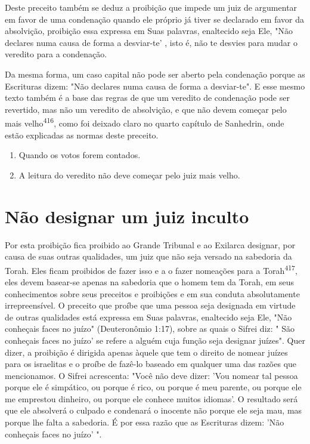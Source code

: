 \begin{itemize}
\begin{enumrate}
\begin{itemize}
\begin{itemize}
\begin{itemize}
Deste preceito também se deduz a proibição que impede um juiz de
argumentar em favor de uma condenação quando ele próprio já tiver se
decla­rado em favor da absolvição, proibição essa expressa em Suas
palavras, enalte­cido seja Ele, "Não declares numa causa de forma a
desviar-te' , isto é, não te desvies para mudar o veredito para a
condenação.

Da mesma forma, um caso capital não pode ser aberto pela conde­nação
porque as Escrituras dizem: "Não declares numa causa de forma a
desviar-te". E esse mesmo texto também é a base das regras de que um
veredito de condenação pode ser revertido, mas não um veredito de
absolvição, e que não devem começar pelo mais
velho\textsuperscript{416}, como foi deixado claro no quarto capítu­lo
de Sanhedrin, onde estão explicadas as normas deste preceito.


\begin{enumerate}
\def\labelenumi{\arabic{enumi}.}
\setcounter{enumi}{414}
\item
 
 Quando os votos forem contados.
 
\item
 
 A leitura do veredito não deve começar pelo juiz mais velho.
 
\end{enumerate}


\section{Não designar um juiz inculto}

Por esta proibição fica proibido ao Grande Tribunal e ao Exilarca
designar, por causa de suas outras qualidades, um juiz que não seja
versado na sabedoria da Torah. Eles ficam proibidos de fazer isso e a o
fazer nomeações para a Torah\textsuperscript{417}, eles devem basear-se
apenas na sabedoria que o homem tem da Torah, em seus conhecimentos
sobre seus preceitos e proibições e em sua conduta absolutamente
irrepreensível. O preceito que proíbe que uma pessoa seja designada em
virtude de outras qualidades está expressa em Suas palavras, enaltecido
seja Ele, "Não conheçais faces no juízo" (Deuteronômio 1:17), so­bre as
quais o Sifrei diz: " São conheçais faces no juízo' se refere a alguém
cuja função seja designar juízes". Quer dizer, a proibição é dirigida
apenas àquele que tem o direito de nomear juízes para os israelitas e o
proíbe de fazê-lo basea­do em qualquer uma das razões que mencionamos. O
Sifrei acrescenta: "Você não deve dizer: 'Vou nomear tal pessoa porque
ele é simpático, ou porque é rico, ou porque é meu parente, ou porque
ele me emprestou dinheiro, ou por­que ele conhece muitos idiomas'. O
resultado será que ele absolverá o culpado e condenará o inocente não
porque ele seja mau, mas porque lhe falta a sabe­doria. É por essa razão
que as Escrituras dizem: 'Não conheçais faces no juízo' ".


\end{itemize}
\end{itemize}
\end{itemize}
\end{enumrate}
\end{itemize}
